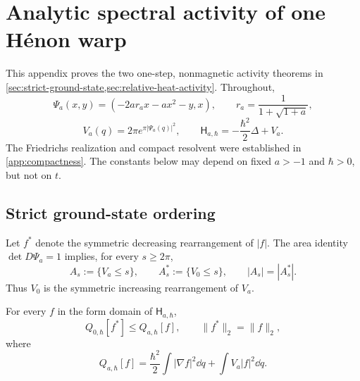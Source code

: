 \section{Analytic spectral activity of one H\'enon warp}
\label{app:analytic-activity}

This appendix proves the two one-step, nonmagnetic activity theorems in
\cref{sec:strict-ground-state,sec:relative-heat-activity}.  Throughout,
\begin{equation}
 \Psi_a(x,y)=(-2ar_ax-ax^2-y,x),
 \qquad
 r_a=\frac1{1+\sqrt{1+a}},
 \label{eq:app-activity-warp}
\end{equation}
\begin{equation}
 V_a(q)=2\pi e^{\pi|\Psi_a(q)|^2},
 \qquad
 \mathsf H_{a,\hbar}=-\frac{\hbar^2}{2}\Delta+V_a.
 \label{eq:app-activity-operator}
\end{equation}
The Friedrichs realization and compact resolvent were established in
\cref{app:compactness}.  The constants below may depend on fixed
\(a>-1\) and \(\hbar>0\), but not on \(t\).

\subsection{Strict ground-state ordering}
\label{app:strict-ground-state}

Let \(f^*\) denote the symmetric decreasing rearrangement of \(|f|\).
The area identity \(\det D\Psi_a=1\) implies, for every \(s\ge2\pi\),
\begin{equation}
 A_s:=\{V_a\le s\},
 \qquad
 A_s^*:=\{V_0\le s\},
 \qquad
 |A_s|=|A_s^*|.
 \label{eq:app-equimeasurable-sets}
\end{equation}
Thus \(V_0\) is the symmetric increasing rearrangement of \(V_a\).

\begin{lemma}
\label{lem:app-rayleigh-rearrangement}
For every \(f\) in the form domain of \(\mathsf H_{a,\hbar}\),
\begin{equation}
 Q_{0,\hbar}[f^*]\le Q_{a,\hbar}[f],
 \qquad \|f^*\|_2=\|f\|_2,
 \label{eq:app-rayleigh-rearrangement}
\end{equation}
where
\begin{equation}
 Q_{a,\hbar}[f]
 =\frac{\hbar^2}{2}\int|\nabla f|^2\dd q
 +\int V_a|f|^2\dd q.
\end{equation}
\end{lemma}

